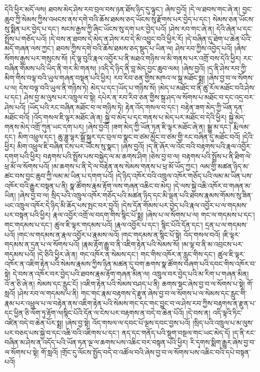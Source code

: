 དེའི་ཕྱིར་མདོ་ལས། ཐབས་མེད་ཤེས་རབ་བྲལ་བས་ཉན་ཐོས་ཉིད་དུ་ལྟུང་། ཞེས་བྱའོ། །དེ་ལ་ཐབས་གང་ཞེ་ན། བྱང་ཆུབ་ཀྱི་སེམས་ཀྱིས་འཕངས་ནས་དགེ་བའི་ཆོས་ཐམས་ཅད་ཡོངས་སུ་རྫོགས་པར་བྱེད་པ་དང་། སེམས་ཅན་ཡོངས་སུ་སྨིན་པར་བྱེད་པ་དང་། སངས་རྒྱས་ཀྱི་ཞིང་ཡོངས་སུ་དག་པར་བྱེད་པའོ། །ཤེས་རབ་གང་ཞེ་ན། དེའི་ཞེན་པ་དང་སྤྲོས་པ་གཅོད་པའོ། །དེ་བས་ན་ཐབས་དེ་མེད་ན་ཤེས་རབ་དེ་མི་འབྱུང་བའི་ཕྱིར་རོ། །དེ་བཞིན་དུ་ཐེག་པ་ཆེན་པོའི་མདོ་གཞན་ལས་ཀྱང་། ཐབས་ཀྱིས་དགེ་བའི་ཆོས་ཐམས་ཅད་སྡུད་པ་ཡིན་ལ། ཤེས་རབ་ཀྱིས་འབྱེད་པའོ། །ཞེས་སོགས་རྒྱས་པར་གསུངས་སོ། །དེ་ལྟ་བུའི་རྣལ་འབྱོར་པ་ནི་མཐའ་གཉིས་ལ་མི་གནས་པར་འགྲོ་བས་དེའི་ཕྱིར། རང་བཞིན་གོམས་པའི་ཡིད་ནི་གར་མི་གནས། །འདི་དེ་ཉིད་ནི་བླ་མེད་བྱང་ཆུབ་ལམ། །ཞེས་བྱའོ། །ད་ནི་ཤེས་རབ་ཀྱི་མིག་གིས་བལྟ་བའི་ཡུལ་གཞན་བསྟན་པའི་ཕྱིར། རབ་རིབ་ཅན་གྱིས་མཁའ་ལ་སྐྲ་མཐོང་སྨྲ། །ཞེས་བྱ་བ་ལ་སོགས་པ་ལ། དེས་བལྟ་བའི་ཡུལ་ནི་གཉིས་ཏེ། མེད་པ་དང་།ཡོད་པ་གཉིས་སོ། །མེད་པ་མཐོང་བ་ནི་ཚུ་རོལ་མཐོང་བའི་ཤེས་པ་དང་། ཤེས་བྱ་མ་ལུས་པར་འཁྲུལ་བ་སྟེ། དཔེར་ན་རབ་རིབ་ཅན་གྱིས་སྐྲ་ཤད་ལ་སོགས་པ་མཐོང་བ་དང་འདྲ་བར་ཤེས་པའོ། །ཡོད་པའི་རང་བཞིན་མཐོང་བ་ལ་གཉིས་ཏེ། རྟེན་འོད་གསལ་བ་དང་། བརྟེན་ཟག་མེད་ཀྱི་ཡོན་ཏན་མཐོང་བའོ། །འོད་གསལ་ཇི་ལྟར་མཐོང་ཞེ་ན། སྐྱེ་བ་མེད་པ་དང་གནས་པ་མེད་པར་མཐོང་བ་དེའི་ཕྱིར། སྐྱེ་མེད་གནས་མེད་འགྲོ་ཀུན་ཡང་དག་པར། །ཞེས་བྱའོ། །ཟག་མེད་ཀྱི་ཡོན་ཏན་ཇི་ལྟར་མཐོང་ཞེ་ན། སྒྱུ་མ་དང་། རྨི་ལམ་དང་། མིག་འཕྲུལ་དང་། ཆུ་ཟླ་ལྟར་སྒྲོ་སྐུར་དང་བྲལ་བ་སྣང་བ་ཙམ་མྱོང་བ་ཙམ་གྱི་རང་བཞིན་དུ་མཐོང་བའོ། །དེའི་ཕྱིར། མིག་འཕྲུལ་ཇི་བཞིན་ངེས་པར་ཡོངས་སུ་སྣང་། །ཞེས་བྱའོ། །ད་ནི་ཞོར་ལ་འོང་བའི་བརྟགས་པའི་རྣལ་འབྱོར་དགག་པའི་ཕྱིར། བརྟགས་པའི་སྤྲོས་པས་བསྐྱེད་ལ་མ་ཆགས་ཤིག །ཅེས་བྱ་བ་ལ། བརྟགས་པའི་སྤྲོས་པ་ནི་ཐིག་ལེ་ཕྲ་མོ་ལ་སོགས་པའོ། །མ་ཆགས་པ་ནི་དེ་ལ་བརྟེན་ནས་སེམས་གནས་པ་ཕྲ་མོ་ཡོད་ཀྱང་། ལམ་གྱི་མཚན་ཉིད་མ་ཚང་བས་བྱང་ཆུབ་ཀྱི་ལམ་མ་ཡིན་པ་དགག་པའོ། །དེ་ཉིད་འཁོར་བའི་འཁྲུལ་འཁོར་གཅོད་པའི་ལམ་མ་ཡིན་པས་འཁོར་བའི་རྒྱུར་བསྟན་པ་ནི། སྣ་ཚོགས་རྣམ་རྟོག་ལས་གཞན་འཆིང་བ་མེད། །དེ་ལས་སྐྱེ་འཆི་འཁོར་བ་གཞན་མ་ཡིན། །ཞེས་བྱ་བ་ལ། སྲིད་པའི་འཁྲུལ་འཁོར་གཅོད་པའི་མཚན་ཉིད་དང་མི་ལྡན་པའི་ཐབས་རྣམས་གོམས་སུ་ཟིན་ཡང་འཁྲུལ་འཁོར་དེ་ཉིད་མི་ཆོད་པས་སྤང་བར་བྱའོ། །དེས་དོན་གོམས་པར་བྱེད་པའི་རྣལ་འབྱོར་པ་ལ་གདམས་པར་བསྟན་པའི་ཕྱིར། རྣལ་འབྱོར་འགྲོ་ལ་བདག་གིས་སྙིང་པོ་སྨྲ། །ཞེས་པ་ལ་སོགས་པ་ལ། གང་ལ་གདམས་པ་དང་། གང་གདམས་པ་དང་། ཚུལ་ཇི་ལྟར་གདམས་པའོ། །རྣལ་འབྱོར་པ་དང་། སྙིང་པོའི་དོན་དང་། དྲན་པ་ལ་གདམས་པའོ། །གང་ལ་གདམས་ན་རྣལ་འབྱོར་པ་རྣམས་ལའོ། །གང་གདམས་ན་སྙིང་པོ་སྟེ། འོད་གསལ་བའོ། །ཇི་ལྟར་གདམས་ན་དྲན་པ་ལ་སོགས་པའོ། །རྣམ་རྟོག་རྒྱུ་བ་ནི་འཇིག་རྟེན་པའི་སེམས་སོ། །མ་ལྟ་བ་ནི་མ་འབྲངས་པར་གདམས་པའོ། །དེ་ཅིའི་ཕྱིར་ཞེ་ན། གང་འཁོར་ན་སེམས་དང་། གང་གིས་འཁོར་ན་རླུང་གིས་དང་། ཚུལ་ཇི་ལྟར་འཁོར་ན་འཇིག་རྟེན་པའི་སེམས་རྣམས་ཀྱིས་ཉིན་མཚན་དུ་བག་ཆགས་སྣ་ཚོགས་བཞག་པའི་དབང་གིས་འཁོར་བ་སྟེ། དེ་བས་ན་འཁོར་བར་བྱེད་པའི་ཐབས་རྣམ་རྟོག་གཞན་མིན་ལ། འཁྲུལ་བར་བྱེད་པའི་མ་རིག་པ་གཞན་མིན། འོ་ན་ཅི་ཞེ་ན། སེམས་དང་རླུང་ངོ། །འཇིག་རྟེན་པའི་སེམས་བཤད་པ་ནི། ཆགས་སྡང་ཞེས་བྱ་བ་ལ་སོགས་པ་སྟེ། གོ་སླའོ། །ཤེས་རབ་ལ་གདམས་པ་ནི། གང་གང་རྣམ་བརྟགས་དེ་རྫུན་ཞེས་བྱ་བ་ལ་སོགས་པ་ལ་སེམས་དང་རླུང་གི་རྣམ་པར་འཕྲུལ་པ་ལ་བརྟེན་ནས་འཇིག་རྟེན་པའི་སེམས་གང་དང་གང་བྱུང་བ་ལ་ཤེས་རབ་ཀྱིས་བརྟགས་ན་རྫུན་པ་དང་ཕྱིན་ཅི་ལོག་ཏུ་རྟོག་ལ།སྙིང་པོའི་དོན་ལ་ངེས་པར་བརྟགས་ན་བདེ་བ་ཆེན་པོའོ། །དེ་བས་ན། འདི་ལྟའི་ཏིང་འཛིན་བདེ་བ་ཆེན་པོར་སྨྲ། །ཞེས་བྱ་སྟེ། འོད་གསལ་ལ་དབང་པོ་ལྔས་དབང་བྱས་པའོ། །སྲིད་པའི་འཁྲུལ་པ་མ་ལུས་པར་བཅད་པས་སྐྱེ་བ་དང་འཆི་བའི་འཇིགས་པ་དང་། ནད་དང་གནོད་པའི་སྡུག་བསྔལ་གང་ཡང་མེད་དོ། །ད་ནི་རང་བཞིན་མ་ཤེས་ན་འདོད་པའི་ཡོན་ཏན་ལྔ་ལ་ཆགས་པས་འཆིང་བར་བསྟན་པའི་ཕྱིར། རི་དྭགས་སྨིག་རྒྱུར་ཞེས་བྱ་བ་ལ་སོགས་པ་སྟེ། གོ་སླའོ། །གྲོང་དུ་ལོངས་སྤྱོད་བདེ་བ་འཚོལ་བའི་ཞེས་བྱ་བ་ལ་སོགས་པས་འཆིང་བའི་དཔེ་བསྟན་པའོ། 